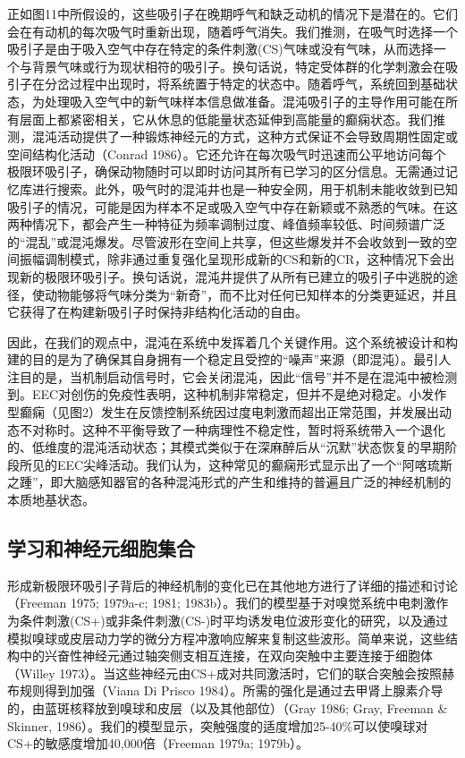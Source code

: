 \documentclass[a4paper,12pt]{article}
\begin{document}
正如图11中所假设的，这些吸引子在晚期呼气和缺乏动机的情况下是潜在的。它们会在有动机的每次吸气时重新出现，随着呼气消失。我们推测，在吸气时选择一个吸引子是由于吸入空气中存在特定的条件刺激(CS)气味或没有气味，从而选择一个与背景气味或行为现状相符的吸引子。换句话说，特定受体群的化学刺激会在吸引子在分岔过程中出现时，将系统置于特定的状态中。随着呼气，系统回到基础状态，为处理吸入空气中的新气味样本信息做准备。混沌吸引子的主导作用可能在所有层面上都紧密相关，它从休息的低能量状态延伸到高能量的癫痫状态。我们推测，混沌活动提供了一种锻炼神经元的方式，这种方式保证不会导致周期性固定或空间结构化活动（Conrad 1986）。它还允许在每次吸气时迅速而公平地访问每个极限环吸引子，确保动物随时可以即时访问其所有已学习的区分信息。无需通过记忆库进行搜索。此外，吸气时的混沌井也是一种安全网，用于机制未能收敛到已知吸引子的情况，可能是因为样本不足或吸入空气中存在新颖或不熟悉的气味。在这两种情况下，都会产生一种特征为频率调制过度、峰值频率较低、时间频谱广泛的“混乱”或混沌爆发。尽管波形在空间上共享，但这些爆发并不会收敛到一致的空间振幅调制模式，除非通过重复强化呈现形成新的CS和新的CR，这种情况下会出现新的极限环吸引子。换句话说，混沌井提供了从所有已建立的吸引子中逃脱的途径，使动物能够将气味分类为“新奇”，而不比对任何已知样本的分类更延迟，并且它获得了在构建新吸引子时保持非结构化活动的自由。

因此，在我们的观点中，混沌在系统中发挥着几个关键作用。这个系统被设计和构建的目的是为了确保其自身拥有一个稳定且受控的“噪声”来源（即混沌）。最引人注目的是，当机制启动信号时，它会关闭混沌，因此“信号”并不是在混沌中被检测到。EEC对创伤的免疫性表明，这种机制非常稳定，但并不是绝对稳定。小发作型癫痫（见图2）发生在反馈控制系统因过度电刺激而超出正常范围，并发展出动态不对称时。这种不平衡导致了一种病理性不稳定性，暂时将系统带入一个退化的、低维度的混沌活动状态；其模式类似于在深麻醉后从“沉默”状态恢复的早期阶段所见的EEC尖峰活动。我们认为，这种常见的癫痫形式显示出了一个“阿喀琉斯之踵”，即大脑感知器官的各种混沌形式的产生和维持的普遍且广泛的神经机制的本质地基状态。

\subsection{学习和神经元细胞集合}

形成新极限环吸引子背后的神经机制的变化已在其他地方进行了详细的描述和讨论（Freeman 1975; 1979a-c; 1981; 1983b）。我们的模型基于对嗅觉系统中电刺激作为条件刺激(CS+)或非条件刺激(CS-)时平均诱发电位波形变化的研究，以及通过模拟嗅球或皮层动力学的微分方程冲激响应解来复制这些波形。简单来说，这些结构中的兴奋性神经元通过轴突侧支相互连接，在双向突触中主要连接于细胞体（Willey 1973）。当这些神经元由CS+成对共同激活时，它们的联合突触会按照赫布规则得到加强（Viana Di Prisco 1984）。所需的强化是通过去甲肾上腺素介导的，由蓝斑核释放到嗅球和皮层（以及其他部位）（Gray 1986; Gray, Freeman \& Skinner, 1986）。我们的模型显示，突触强度的适度增加25-40\%可以使嗅球对CS+的敏感度增加40,000倍（Freeman 1979a; 1979b）。
\end{document}

